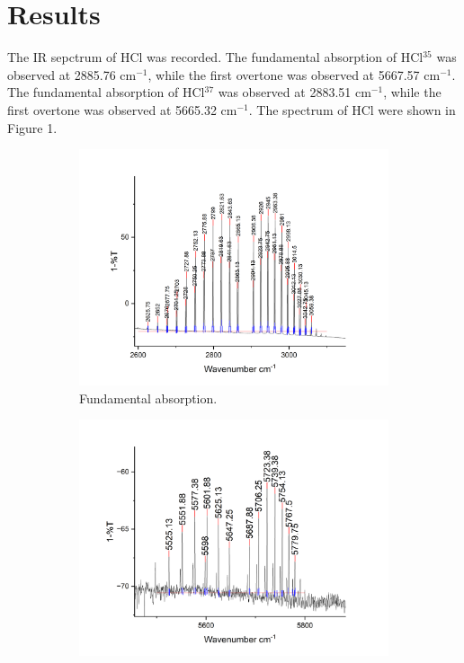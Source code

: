 \documentclass[twocolumn]{article} %
\begin{document}
\section{Results}  

The IR sepctrum of HCl was recorded. The fundamental absorption of HCl$^{35}$ was observed at 2885.76 cm$^{-1}$, while the first overtone was observed at 5667.57 cm$^{-1}$. The fundamental absorption of HCl$^{37}$ was observed at 2883.51 cm$^{-1}$, while the first overtone was observed at 5665.32 cm$^{-1}$. The spectrum of HCl were shown in Figure 1.\\[2\baselineskip]

\begin{figure}[h!]
    \begin{subfigure}[b]{0.95\columnwidth}
        \includegraphics[width=\columnwidth]{HCl fund.png}
        \caption{Fundamental absorption.}
        \label{fig:sfig1}
    \end{subfigure}
    \begin{subfigure}[b]{0.95\columnwidth}
      \includegraphics[width=\columnwidth]{HCl over.png}

\end{subfigure}
\end{figure}
\end{document}
